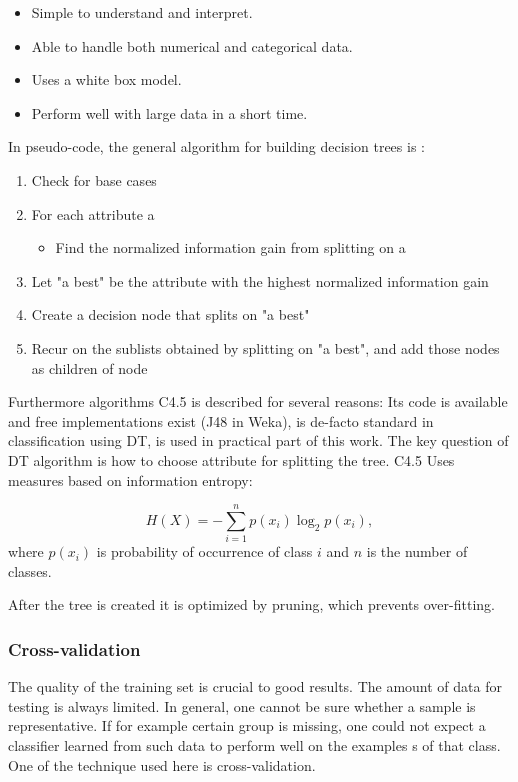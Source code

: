 \begin{itemize}
\item Simple to understand and interpret.
\item Able to handle both numerical and categorical data.
\item Uses a white box model.
\item Perform well with large data in a short time.
\end{itemize}

In pseudo-code, the general algorithm for building decision trees is
\cite{kotsiantis2007supervised}:
\begin{enumerate}
\item Check for base cases
\item For each attribute a
  \begin{itemize}
  \item Find the normalized information gain from splitting on a
  \end{itemize}
\item Let "a best" be the attribute with the highest normalized information gain
\item Create a decision node that splits on "a best"
\item Recur on the sublists obtained by splitting on "a best", and add
  those nodes as children of node
\end{enumerate}

Furthermore algorithms C4.5 is described for several reasons: Its code
is available and free implementations exist (J48 in Weka), is de-facto
standard in classification using DT, is used in practical part of this
work. The key question of DT algorithm is how to choose attribute for
splitting the tree. C4.5 Uses measures based on information entropy:

\begin{equation}
  \label{eq:entropy}
  H(X) = -\sum_{i=1}^n {p(x_i) \log_2 p(x_i)},
\end{equation}
where $p(x_i)$ is probability of occurrence of class $i$ and $n$ is the
number of classes.

After the tree is created it is optimized by pruning, which prevents
over-fitting.

\subsubsection{Cross-validation}
The quality of the training set is crucial to good results. The amount
of data for testing is always limited. In general, one cannot be sure
whether a sample is representative. If for example certain group is
missing, one could not expect a classifier learned from such data to
perform well on the examples s of that class. One of the technique used
here is cross-validation.


